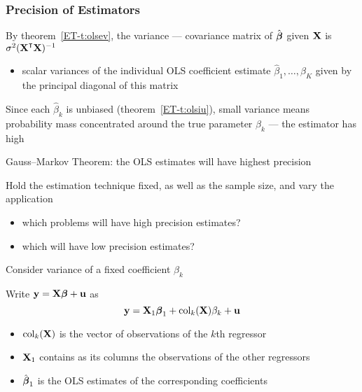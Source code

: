 \begin{frame}
    \frametitle{Precision of Estimators}

    \vspace{2em}
    By theorem~\ref{ET-t:olsev}, the variance --- covariance matrix of 
    $\hat {\boldsymbol \beta}$ given $\mathbf X$ is $\sigma^2 (\boldX^\T \boldX)^{-1}$
    \begin{itemize}
        \item scalar variances of the individual OLS coefficient estimate $\hat
    \beta_1, \ldots, \hat \beta_K$ given by the principal diagonal of this
    matrix
    \end{itemize}
    
    \vspace{.7em}
    Since each $\hat \beta_k$ is unbiased
    (theorem~\ref{ET-t:olsiu}), small variance means
    probability mass concentrated around the true 
    parameter $\beta_k$ --- the estimator has high  


\end{frame}

\begin{frame}

    \vspace{2em}
    Gauss--Markov Theorem: the OLS estimates will have highest precision
    
    \vspace{.7em}
    Hold the
    estimation technique fixed, as well as the sample size, and vary the
    application
    \begin{itemize}
        \item which problems will have high precision estimates?
        \item which will
            have low precision estimates?
    \end{itemize}
    
    Consider variance of a fixed
    coefficient $\beta_k$ 

\end{frame}

\begin{frame}

    \vspace{2em}
    Write ${\mathbf y} = \mathbf X
    {\boldsymbol \beta} + {\mathbf u}$ as
    \begin{equation}
        \label{eq:cfrm}
        {\mathbf y} = \mathbf X_1 {\boldsymbol \beta}_1 + \operatorname{col}_k (\mathbf X) \beta_k + {\mathbf u}
    \end{equation}
    \begin{itemize}
        \item $\operatorname{col}_k(\mathbf X)$ is the vector of observations of the $k$th regressor
        \item  $\mathbf X_1$ contains as its columns the observations of the other regressors
        \item $\hat {\boldsymbol \beta}_1$ is the OLS estimates of the corresponding coefficients
    \end{itemize}
    
\end{frame}

